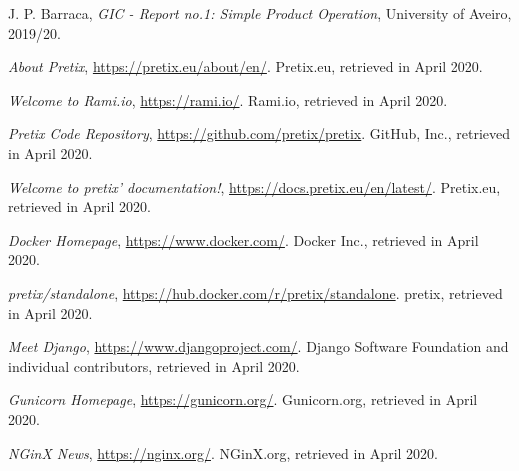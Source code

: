 \documentclass[12pt]{article}
\begin{document}
\begin{thebibliography}{9} %
  

    J. P. Barraca,
    \textit{GIC - Report no.1: Simple Product Operation},
    University of Aveiro,
    2019/20.
    \vspace{-10pt}

    \textit{About Pretix},
    \url{https://pretix.eu/about/en/}.
    Pretix.eu,
    retrieved in April 2020.
    \vspace{-10pt}

    \textit{Welcome to Rami.io},
    \url{https://rami.io/}.
    Rami.io,
    retrieved in April 2020.
    \vspace{-10pt}

    \textit{Pretix Code Repository},
    \url{https://github.com/pretix/pretix}.
    GitHub, Inc.,
    retrieved in April 2020.
    \vspace{-10pt}

    \textit{Welcome to pretix' documentation!},
    \url{https://docs.pretix.eu/en/latest/}.
    Pretix.eu,
    retrieved in April 2020.
    \vspace{-10pt}

    \textit{Docker Homepage},
    \url{https://www.docker.com/}.
    Docker Inc.,
    retrieved in April 2020.
    \vspace{-26pt}

    \textit{pretix/standalone},
    \url{https://hub.docker.com/r/pretix/standalone}.
    pretix,
    retrieved in April 2020.
    \vspace{-10pt}

    \textit{Meet Django},
    \url{https://www.djangoproject.com/}.
    Django Software Foundation and individual contributors,
    retrieved in April 2020.
    \vspace{-10pt}

    \textit{Gunicorn Homepage},
    \url{https://gunicorn.org/}.
    Gunicorn.org,
    retrieved in April 2020.
    \vspace{-10pt}

    \textit{NGinX News},
    \url{https://nginx.org/}.
    NGinX.org,
    retrieved in April 2020.
    \vspace{-10pt}


\end{thebibliography}
\end{document}
